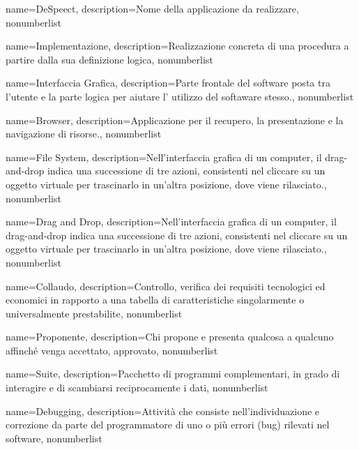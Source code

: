 \usepackage{glossaries}
\usepackage[utf8x]{inputenc}
\usepackage[italian]{babel}

\makeglossaries

{
	name={DeSpeect},
	description={Nome della applicazione da realizzare},
	nonumberlist 
}

{
	name={Implementazione},
	description={Realizzazione concreta di una procedura a partire dalla sua definizione logica},
	nonumberlist 
}

{
name={Interfaccia Grafica},
description={Parte frontale del software posta tra l'utente e la parte logica per aiutare l' utilizzo del softaware stesso.},
nonumberlist 
}

{
name={Browser},
description={Applicazione per il recupero, la presentazione e la navigazione di risorse.},
nonumberlist 
}

{
name={File System},
description={Nell'interfaccia grafica di un computer, il drag-and-drop indica una successione di tre azioni, consistenti nel cliccare su un oggetto virtuale per trascinarlo in un'altra posizione, dove viene rilasciato.},
nonumberlist 
}

{
name={Drag and Drop},
description={Nell'interfaccia grafica di un computer, il drag-and-drop indica una successione di tre azioni, consistenti nel cliccare su un oggetto virtuale per trascinarlo in un'altra posizione, dove viene rilasciato.},
nonumberlist 
}

{
	name={Collaudo},
	description={Controllo, verifica dei requisiti tecnologici ed economici in rapporto a una tabella di caratteristiche singolarmente o universalmente prestabilite},
	nonumberlist 
}

{
	name={Proponente},
	description={Chi propone e presenta qualcosa a qualcuno affinché venga accettato, approvato},
	nonumberlist 
}

{
	name={Suite},
	description={Pacchetto di programmi complementari, in grado di interagire e di scambiarsi reciprocamente i dati},
	nonumberlist 
}

{
	name={Debugging},
	description={Attività che consiste nell'individuazione e correzione da parte del programmatore di uno o più errori (bug) rilevati nel software},
	nonumberlist 
}

